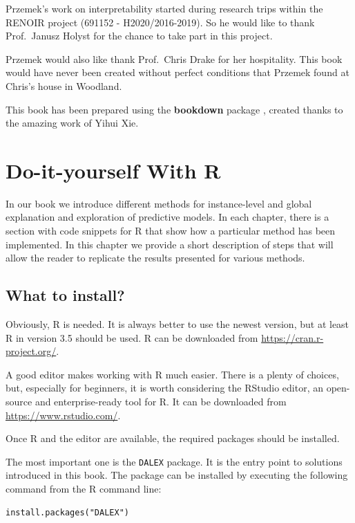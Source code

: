 \documentclass[12pt,]{krantz}
\begin{document}
Przemek's work on interpretability started during research trips within the RENOIR project (691152 - H2020/2016-2019). So he would like to thank Prof.~Janusz Holyst for the chance to take part in this project.

Przemek would also like thank Prof.~Chris Drake for her hospitality. This book would have never been created without perfect conditions that Przemek found at Chris's house in Woodland.

This book has been prepared using the \textbf{bookdown} package \citep{R-bookdown}, created thanks to the amazing work of Yihui Xie.

\hypertarget{doItYourselfWithR}{%
\section{Do-it-yourself With R}\label{doItYourselfWithR}}

In our book we introduce different methods for instance-level and global explanation and exploration of predictive models. In each chapter, there is a section with code snippets for R that show how a particular method has been implemented. In this chapter we provide a short description of steps that will allow the reader to replicate the results presented for various methods.

\hypertarget{what-to-install}{%
\subsection{What to install?}\label{what-to-install}}

Obviously, R \citep{RcoreT} is needed. It is always better to use the newest version, but at least R in version 3.5 should be used. R can be downloaded from \url{https://cran.r-project.org/}.

A good editor makes working with R much easier. There is a plenty of choices, but, especially for beginners, it is worth considering the RStudio editor, an open-source and enterprise-ready tool for R. It can be downloaded from \url{https://www.rstudio.com/}.

Once R and the editor are available, the required packages should be installed.

The most important one is the \texttt{DALEX} package. It is the entry point to solutions introduced in this book. The package can be installed by executing the following command from the R command line:

\begin{verbatim}
install.packages("DALEX")
\end{verbatim}
\end{document}

